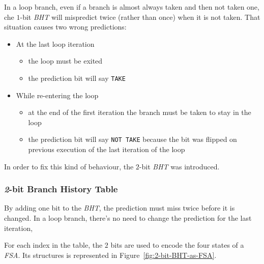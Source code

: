 \documentclass[english]{article}
\begin{document}
\bigskip
In a loop branch, even if a branch is almost always taken and then not taken one, che \(1\)-bit \textit{BHT} will mispredict twice (rather than once) when it is not taken.
That situation causes two wrong predictions:
\begin{itemize}
  \item At the last loop iteration
        \begin{itemize}
          \item the loop must be exited
          \item the prediction bit will say \texttt{TAKE}
        \end{itemize}
  \item While re-entering the loop
        \begin{itemize}
          \item at the end of the first iteration the branch must be taken to stay in the loop
          \item the prediction bit will say \texttt{NOT\ TAKE} because the bit was flipped on previous execution of the last iteration of the loop
        \end{itemize}
\end{itemize}

In order to fix this kind of behaviour, the \(2\)-bit \textit{BHT} was introduced.

\subsubsection{\textit{2}-bit Branch History Table}

By adding one bit to the \textit{BHT}, the prediction must miss twice before it is changed.
In a loop branch, there's no need to change the prediction for the last iteration,

For each index in the table, the \(2\) bits are used to encode the four states of a \textit{FSA}.
Its structures is represented in Figure~\ref{fig:2-bit-BHT-as-FSA}.
\end{document}
